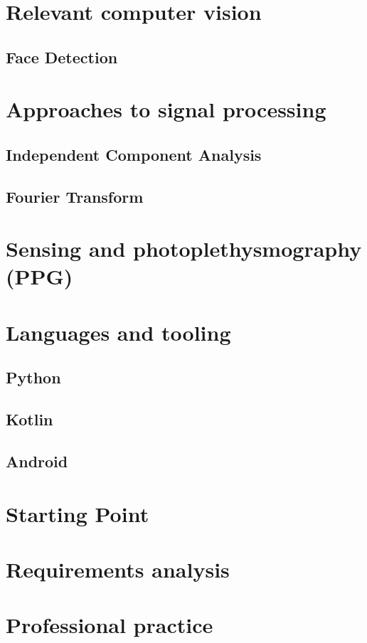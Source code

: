 
\section{Relevant computer vision}
\subsection{Face Detection}
\section{Approaches to signal processing}
\subsection{Independent Component Analysis}
\subsection{Fourier Transform}

\section{Sensing and photoplethysmography (PPG)}

\section{Languages and tooling}
\subsection{Python}
\subsection{Kotlin}
\subsection{Android}

\section{Starting Point}
\section{Requirements analysis}
\section{Professional practice}